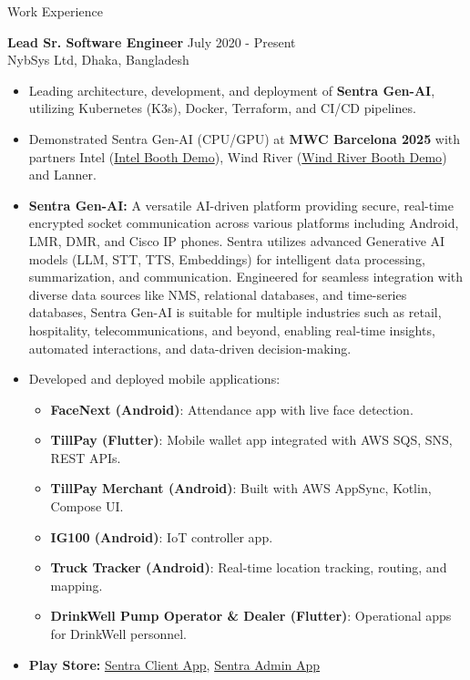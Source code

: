 \documentclass{resume}
\begin{document}
    \begin{rSection}{Work Experience}

    {\bf Lead Sr. Software Engineer} \hfill July 2020 - Present\\
    NybSys Ltd, Dhaka, Bangladesh
    \begin{itemize}
        \itemsep -2pt
        \item Leading architecture, development, and deployment of \textbf{Sentra Gen-AI}, utilizing Kubernetes (K3s), Docker, Terraform, and CI/CD pipelines.
        \item Demonstrated Sentra Gen-AI (CPU/GPU) at \textbf{MWC Barcelona 2025} with partners Intel (\href{https://www.youtube.com/watch?v=c-kq6M8Or5Q}{Intel Booth Demo}), Wind River (\href{https://www.youtube.com/watch?v=7MGbi-pOHqI}{Wind River Booth Demo}) and Lanner.
        \item \textbf{Sentra Gen-AI:} A versatile AI-driven platform providing secure, real-time encrypted socket communication across various platforms including Android, LMR, DMR, and Cisco IP phones. Sentra utilizes advanced Generative AI models (LLM, STT, TTS, Embeddings) for intelligent data processing, summarization, and communication. Engineered for seamless integration with diverse data sources like NMS, relational databases, and time-series databases, Sentra Gen-AI is suitable for multiple industries such as retail, hospitality, telecommunications, and beyond, enabling real-time insights, automated interactions, and data-driven decision-making.
        \item Developed and deployed mobile applications:
        \begin{itemize}
            \item \textbf{FaceNext (Android)}: Attendance app with live face detection.
            \item \textbf{TillPay (Flutter)}: Mobile wallet app integrated with AWS SQS, SNS, REST APIs.
            \item \textbf{TillPay Merchant (Android)}: Built with AWS AppSync, Kotlin, Compose UI.
            \item \textbf{IG100 (Android)}: IoT controller app.
            \item \textbf{Truck Tracker (Android)}: Real-time location tracking, routing, and mapping.
            \item \textbf{DrinkWell Pump Operator \& Dealer (Flutter)}: Operational apps for DrinkWell personnel.
        \end{itemize}
        \item \textbf{Play Store:} \href{https://play.google.com/store/search?q=sentra&c=apps}{Sentra Client App}, \href{https://play.google.com/store/apps/details?id=com.nybsys.sentra.admin}{Sentra Admin App}
    \end{itemize}



\end{rSection}
\end{document}
